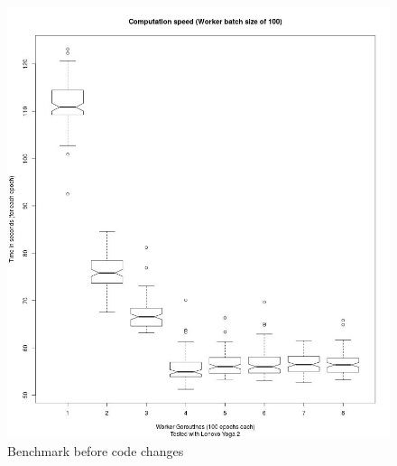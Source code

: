 \documentclass[11pt]{article}
\begin{document}
\begin{figure}[H]
	\includegraphics[width=1.0\textwidth, height=0.75\textheight]{./Data/WrongMath/Images/oldAllGoroutines.jpg}
	\vspace{-1em}
	\caption{Benchmark before code changes}
	\vspace{-0.5em}
	\label{fig:oldAllGoroutines}
\end{figure}
\end{document}
